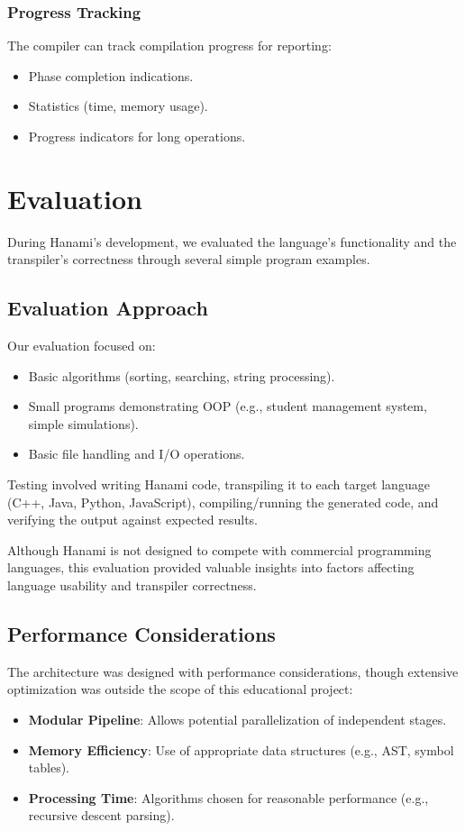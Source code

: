 \documentclass[conference]{IEEEtran}
\begin{document}
\subsubsection{Progress Tracking}
The compiler can track compilation progress for reporting: %
\begin{itemize}
    \item Phase completion indications.
    \item Statistics (time, memory usage).
    \item Progress indicators for long operations.
\end{itemize}

\section{Evaluation}
\label{sec:evaluation}

During Hanami's development, we evaluated the language's functionality and the transpiler's correctness through several simple program examples. %


\subsection{Evaluation Approach}
Our evaluation focused on:
\begin{itemize}
    \item Basic algorithms (sorting, searching, string processing).
    \item Small programs demonstrating OOP (e.g., student management system, simple simulations).
    \item Basic file handling and I/O operations. %
\end{itemize}
Testing involved writing Hanami code, transpiling it to each target language (C++, Java, Python, JavaScript), compiling/running the generated code, and verifying the output against expected results.

Although Hanami is not designed to compete with commercial programming languages, this evaluation provided valuable insights into factors affecting language usability and transpiler correctness.

\subsection{Performance Considerations}
The architecture was designed with performance considerations, though extensive optimization was outside the scope of this educational project:
\begin{itemize}
    \item \textbf{Modular Pipeline}: Allows potential parallelization of independent stages.
    \item \textbf{Memory Efficiency}: Use of appropriate data structures (e.g., AST, symbol tables).
    \item \textbf{Processing Time}: Algorithms chosen for reasonable performance (e.g., recursive descent parsing).
\end{itemize}
\end{document}
